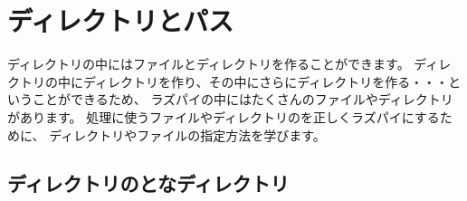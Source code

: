 % 　

\section{ディレクトリとパス}
ディレクトリの中にはファイルとディレクトリを作ることができます。
ディレクトリの中にディレクトリを作り、その中にさらにディレクトリを作る・・・ということができるため、
ラズパイの中にはたくさんのファイルやディレクトリがあります。
処理に使うファイルやディレクトリのを正しくラズパイにするために、
ディレクトリやファイルの指定方法を学びます。

\subsection{ディレクトリのとなディレクトリ}

